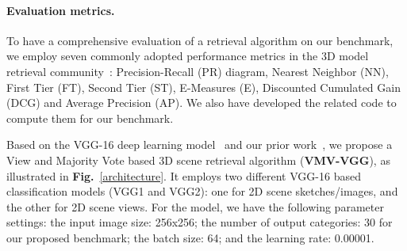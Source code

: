 \documentclass[times, 10pt,twocolumn]{article}
\begin{document}
\paragraph{Evaluation metrics.}   
To have a comprehensive evaluation of a retrieval algorithm on our benchmark, we employ seven commonly adopted performance metrics in the 3D model retrieval community~\cite{DBLP:journals/cviu/LiLLGSABCCFFFLLJKKOTWZZ15}: Precision-Recall (PR) diagram, Nearest Neighbor (NN), First Tier (FT), Second Tier (ST), E-Measures (E), Discounted Cumulated Gain (DCG) and Average Precision (AP). We also have developed the related code to compute them for our benchmark.


\label{sec:method}
Based on the VGG-16 deep learning model~\cite{DBLP:journals/corr/SimonyanZ14a} and our prior work~\cite{DBLP:conf/icpr/Ye0L16}, we propose a View and Majority Vote based 3D scene retrieval algorithm (\textbf{VMV-VGG}), as illustrated in \textbf{Fig.}~\ref{architecture}. It employs two different VGG-16 based classification models (VGG1 and VGG2): one for 2D scene sketches/images, and the other for 2D scene views. For the model, we have the following parameter settings: the input image size: 256x256; the number of output categories: 30 for our proposed benchmark;  the batch size: 64; and the learning rate: 0.00001.
\end{document}
